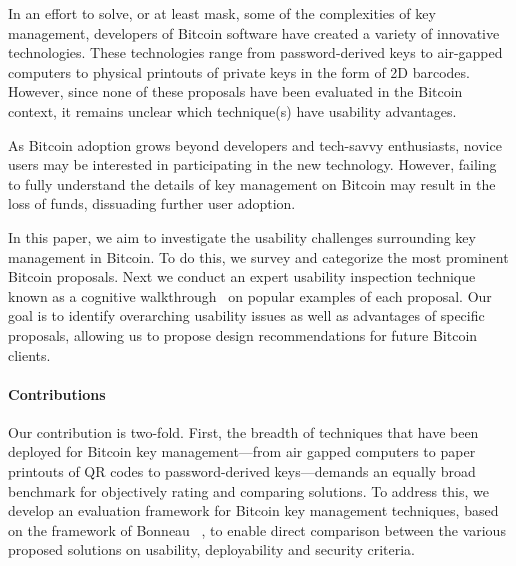 In an effort to solve, or at least mask, some of the complexities of key management, developers of Bitcoin software have created a variety of innovative technologies. These technologies range  from password-derived keys to air-gapped computers to physical printouts of private keys in the form of 2D barcodes. However, since none of these proposals have been evaluated in the Bitcoin context, it remains unclear which technique(s) have usability advantages.

As Bitcoin adoption grows beyond developers and tech-savvy enthusiasts, novice users may be interested in participating in the new technology. However, failing to fully understand the details of key management on Bitcoin may result in the loss of funds, dissuading further user adoption. 

In this paper, we aim to investigate the usability challenges surrounding key management in Bitcoin. To do this, we survey and categorize the most prominent Bitcoin proposals. Next we conduct an expert usability inspection technique known as a cognitive walkthrough~\cite{WRLP94} on popular examples of each proposal. Our goal is to identify overarching usability issues as well as advantages of specific proposals, allowing us to propose design recommendations for future Bitcoin clients. \\



\paragraph{Contributions}
Our contribution is two-fold. First, the breadth of techniques that have been deployed for Bitcoin key management---from air gapped computers to paper printouts of QR codes to password-derived keys---demands an equally broad benchmark for objectively rating and comparing solutions. To address this, we develop an evaluation framework for Bitcoin key management techniques, based on the framework of Bonneau \etal~\cite{BHOS12}, to enable direct comparison between the various proposed solutions on usability, deployability and security criteria.

